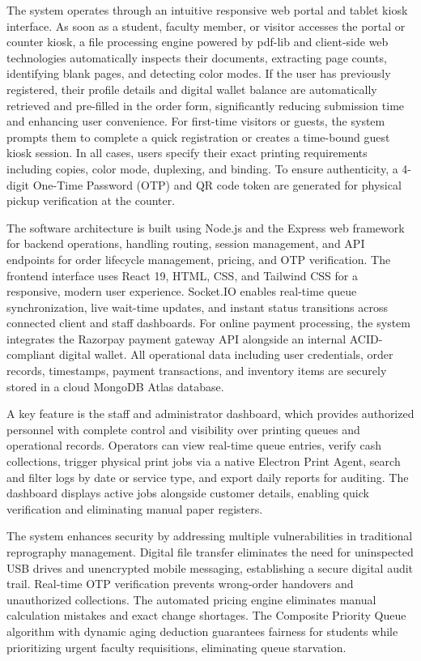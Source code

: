\documentclass[12pt,a4paper]{report}
\begin{document}
The system operates through an intuitive responsive web portal and tablet kiosk interface. As soon as a student, faculty member, or visitor accesses the portal or counter kiosk, a file processing engine powered by pdf-lib and client-side web technologies automatically inspects their documents, extracting page counts, identifying blank pages, and detecting color modes. If the user has previously registered, their profile details and digital wallet balance are automatically retrieved and pre-filled in the order form, significantly reducing submission time and enhancing user convenience. For first-time visitors or guests, the system prompts them to complete a quick registration or creates a time-bound guest kiosk session. In all cases, users specify their exact printing requirements including copies, color mode, duplexing, and binding. To ensure authenticity, a 4-digit One-Time Password (OTP) and QR code token are generated for physical pickup verification at the counter.

The software architecture is built using Node.js and the Express web framework for backend operations, handling routing, session management, and API endpoints for order lifecycle management, pricing, and OTP verification. The frontend interface uses React 19, HTML, CSS, and Tailwind CSS for a responsive, modern user experience. Socket.IO enables real-time queue synchronization, live wait-time updates, and instant status transitions across connected client and staff dashboards. For online payment processing, the system integrates the Razorpay payment gateway API alongside an internal ACID-compliant digital wallet. All operational data including user credentials, order records, timestamps, payment transactions, and inventory items are securely stored in a cloud MongoDB Atlas database.

A key feature is the staff and administrator dashboard, which provides authorized personnel with complete control and visibility over printing queues and operational records. Operators can view real-time queue entries, verify cash collections, trigger physical print jobs via a native Electron Print Agent, search and filter logs by date or service type, and export daily reports for auditing. The dashboard displays active jobs alongside customer details, enabling quick verification and eliminating manual paper registers.

The system enhances security by addressing multiple vulnerabilities in traditional reprography management. Digital file transfer eliminates the need for uninspected USB drives and unencrypted mobile messaging, establishing a secure digital audit trail. Real-time OTP verification prevents wrong-order handovers and unauthorized collections. The automated pricing engine eliminates manual calculation mistakes and exact change shortages. The Composite Priority Queue algorithm with dynamic aging deduction guarantees fairness for students while prioritizing urgent faculty requisitions, eliminating queue starvation.
\end{document}
